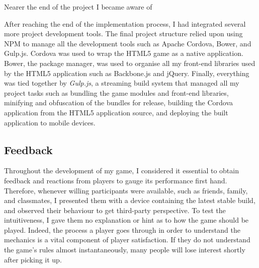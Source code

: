 \documentclass[final]{cmpreport}
\begin{document}
Nearer the end of the project I became aware of 

After reaching the end of the implementation process, I had integrated several more project development tools. The final project structure relied upon using NPM to manage all the development tools such as Apache Cordova, Bower, and Gulp.js. Cordova was used to wrap the HTML5 game as a native application. Bower, the package manager, was used to organise all my front-end libraries used by the HTML5 application such as Backbone.js and jQuery. Finally, everything was tied together by \textit{Gulp.js}, a streaming build system that managed all my project tasks such as bundling the game modules and front-end libraries, minifying and obfuscation of the bundles for release, building the Cordova application from the HTML5 application source, and deploying the built application to mobile devices.

\subsection{Feedback}
Throughout the development of my game, I considered it essential to obtain feedback and reactions from players to gauge its performance first hand. Therefore, whenever willing participants were available, such as friends, family, and classmates, I presented them with a device containing the latest stable build, and observed their behaviour to get third-party perspective. To test the intuitiveness, I gave them no explanation or hint as to how the game should be played. Indeed, the process a player goes through in order to understand the mechanics is a vital component of player satisfaction. If they do not understand the game's rules almost instantaneously, many people will lose interest shortly after picking it up.
\end{document}
